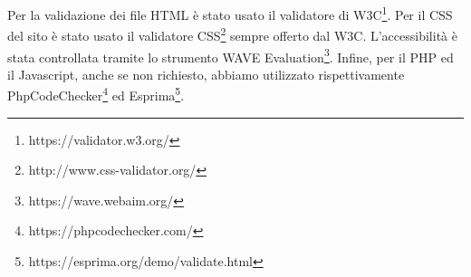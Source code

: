 Per la validazione dei file HTML è stato usato il validatore di W3C\footnote{https://validator.w3.org/}.
Per il CSS del sito è stato usato il validatore CSS\footnote{http://www.css-validator.org/} sempre offerto dal W3C.
L'accessibilità è stata controllata tramite lo strumento WAVE Evaluation\footnote{https://wave.webaim.org/}.
Infine, per il PHP ed il Javascript, anche se non richiesto, abbiamo utilizzato rispettivamente PhpCodeChecker\footnote{https://phpcodechecker.com/} ed Esprima\footnote{https://esprima.org/demo/validate.html}.